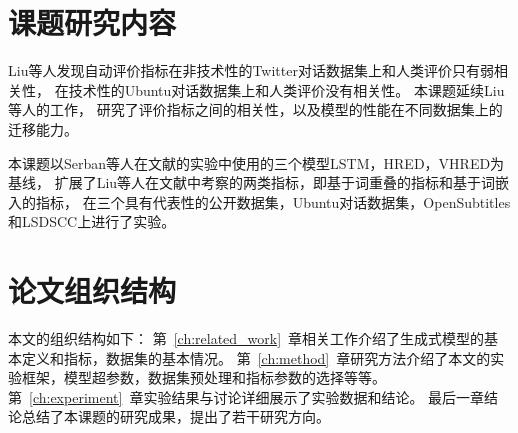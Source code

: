 \section{课题研究内容}\label{sec:reseach_content}
Liu等人发现自动评价指标在非技术性的Twitter对话数据集上和人类评价只有弱相关性，
在技术性的Ubuntu对话数据集上和人类评价没有相关性。
本课题延续Liu等人的工作，
研究了评价指标之间的相关性，以及模型的性能在不同数据集上的迁移能力。

本课题以Serban等人在文献\cite{VHRED}的实验中使用的三个模型LSTM，HRED，VHRED为基线，
扩展了Liu等人在文献\cite{HowNot}中考察的两类指标，即基于词重叠的指标和基于词嵌入的指标，
在三个具有代表性的公开数据集，Ubuntu对话数据集，OpenSubtitles和LSDSCC上进行了实验。

\section{论文组织结构}\label{sec:paper_organization}
本文的组织结构如下：
第~\ref{ch:related_work}~章相关工作介绍了生成式模型的基本定义和指标，数据集的基本情况。
第~\ref{ch:method}~章研究方法介绍了本文的实验框架，模型超参数，数据集预处理和指标参数的选择等等。
第~\ref{ch:experiment}~章实验结果与讨论详细展示了实验数据和结论。
最后一章结论总结了本课题的研究成果，提出了若干研究方向。
